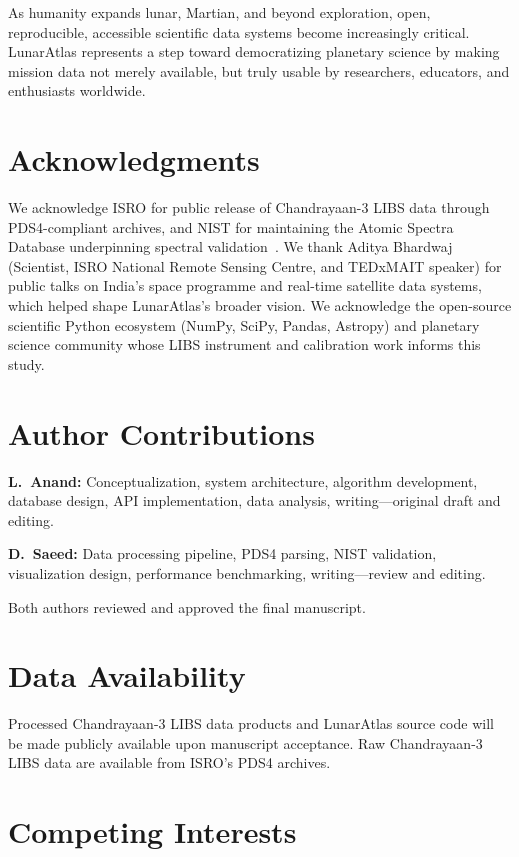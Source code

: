 \documentclass[11pt,a4paper]{article}
\begin{document}
As humanity expands lunar, Martian, and beyond exploration, open, reproducible, accessible scientific data systems become increasingly critical. LunarAtlas represents a step toward democratizing planetary science by making mission data not merely available, but truly usable by researchers, educators, and enthusiasts worldwide.

\section*{Acknowledgments}

We acknowledge ISRO for public release of Chandrayaan-3 LIBS data through PDS4-compliant archives, and NIST for maintaining the Atomic Spectra Database underpinning spectral validation~\cite{Reader2011}. We thank Aditya Bhardwaj (Scientist, ISRO National Remote Sensing Centre, and TEDxMAIT speaker) for public talks on India's space programme and real-time satellite data systems, which helped shape LunarAtlas's broader vision. We acknowledge the open-source scientific Python ecosystem (NumPy, SciPy, Pandas, Astropy) and planetary science community whose LIBS instrument and calibration work informs this study.

\section*{Author Contributions}

\textbf{L.~Anand:} Conceptualization, system architecture, algorithm development, database design, API implementation, data analysis, writing—original draft and editing.

\textbf{D.~Saeed:} Data processing pipeline, PDS4 parsing, NIST validation, visualization design, performance benchmarking, writing—review and editing.

Both authors reviewed and approved the final manuscript.

\section*{Data Availability}

Processed Chandrayaan-3 LIBS data products and LunarAtlas source code will be made publicly available upon manuscript acceptance. Raw Chandrayaan-3 LIBS data are available from ISRO's PDS4 archives.

\section*{Competing Interests}
\end{document}
